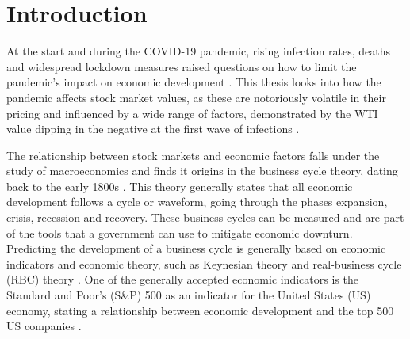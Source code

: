 \section{Introduction}
\label{sec:intro}
% 
% 
% 
% 
% 

At the start and during the COVID-19 pandemic, rising infection rates, deaths and widespread lockdown measures raised questions on how to limit the pandemic's impact on economic development \cite{velavan2020covid}. This thesis looks into how the pandemic affects stock market values, as these are notoriously volatile in their pricing and influenced by a wide range of factors, demonstrated by the WTI value dipping in the negative at the first wave of infections \cite{CORBET2020104978}. 

The relationship between stock markets and economic factors falls under the study of macroeconomics and finds it origins in the business cycle theory, dating back to the early 1800s \cite{de1827nouveaux}. This theory generally states that all economic development follows a cycle or waveform, going through the phases expansion, crisis, recession and recovery. These business cycles can be measured \cite{baxter1999measuring} and are part of the tools that a government can use to mitigate economic downturn. Predicting the development of a business cycle is generally based on economic indicators and economic theory, such as Keynesian theory  \cite{keynes2018general} and real-business cycle (RBC) theory \cite{kydland1982time}. One of the generally accepted economic indicators is the Standard and Poor's (S\&P) 500 as an indicator for the United States (US) economy, stating a relationship between economic development and the top 500 US companies \cite{diblasi_2021}.

